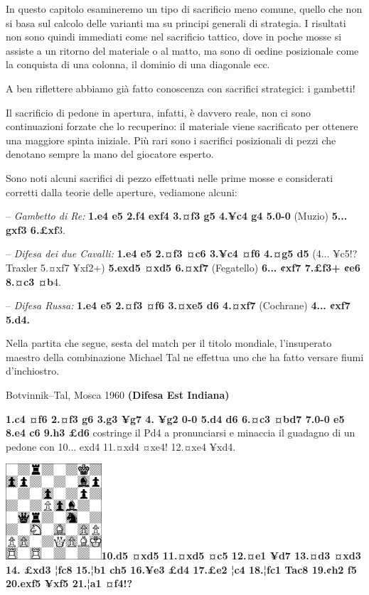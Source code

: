 \documentclass[
]{article}
\begin{document}
In questo capitolo esamineremo un tipo di sacrificio meno comune, quello
che non si basa sul calcolo delle varianti ma su principi generali di
strategia. I risultati non sono quindi immediati come nel sacrificio
tattico, dove in poche mosse si assiste a un ritorno del materiale o al
matto, ma sono di o¢dine posizionale come la conquista di una colonna,
il dominio di una diagonale ecc.

A ben riflettere abbiamo già fatto conoscenza con sacrifici strategici:
i gambetti!

Il sacrificio di pedone in apertura, infatti, è davvero reale, non ci
sono continuazioni forzate che lo recuperino: il materiale viene
sacrificato per ottenere una maggiore spinta iniziale. Più rari sono i
sacrifici posizionali di pezzi che denotano sempre la mano del giocatore
esperto.

Sono noti alcuni sacrifici di pezzo effettuati nelle prime mosse e
considerati corretti dalla teorie delle aperture, vediamone alcuni:

-- \emph{Gambetto di Re:} \textbf{1.e4 e5 2.f4 exf4 3.¤f3 g5 4.¥c4 g4
5.0-0} (Muzio) \textbf{5... gxf3 6.£xf}3.

-- \emph{Difesa dei due Cavalli:} \textbf{1.e4 e5 2.¤f3 ¤c6 3.¥c4 ¤f6
4.¤g5 d5} (4... ¥c5!? Traxler 5.¤xf7 ¥xf2+) \textbf{5.exd5 ¤xd5 6.¤xf7}
(Fegatello) \textbf{6... ¢xf7 7.£f3+ ¢e6 8.¤c3 ¤b}4.

-- \emph{Difesa Russa:} \textbf{1.e4 e5 2.¤f3 ¤f6 3.¤xe5 d6 4.¤xf7}
(Cochrane) \textbf{4... ¢xf7 5.d4.}

Nella partita che segue, sesta del match per il titolo mondiale,
l'insuperato maestro della combinazione Michael Tal ne effettua uno che
ha fatto versare fiumi d'inchiostro.

Botvinnik--Tal, Mosca 1960 \textbf{(Difesa Est Indiana)}

\textbf{1.c4 ¤f6 2.¤f3 g6 3.g3 ¥g7 4. ¥g2 0-0 5.d4 d6 6.¤c3 ¤bd7 7.0-0
e5 8.e4 c6 9.h3 £d6} costringe il Pd4 a pronunciarsi e minaccia il
guadagno di un pedone con 10... exd4 11.¤xd4 ¤xe4! 12.¤xe4 ¥xd4.

\includegraphics[width=1.40139in,height=1.40139in]{vertopal_109f12be458a423d8f3cc838880eaea2/media/image102.png}\textbf{10.d5
¤xd5 11.¤xd5 ¤c5 12.¤e1 ¥d7 13.¤d3 ¤xd3 14. £xd3 ¦fc8 15.¦b1 ch5 16.¥e3
£d4 17.£e2 ¦c4 18.¦fc1 Tac8 19.¢h2 f5 20.exf5 ¥xf5 21.¦a1 ¤f4!?}
\end{document}
